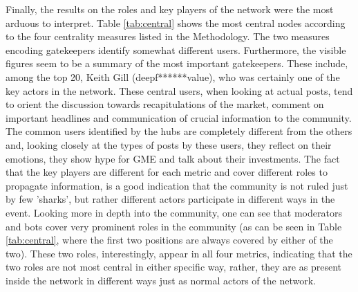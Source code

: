 \documentclass[noacm,sigconf,authorversion]{acmart}
\begin{document}
Finally, the results on the roles and key players of the network were the most arduous to interpret. Table \ref{tab:central} shows the most central nodes according to the four centrality measures listed in the Methodology. The two measures encoding gatekeepers identify somewhat different users. Furthermore, the visible figures seem to be a summary of the most important gatekeepers. These include, among the top 20, Keith Gill (deepf******value), who was certainly one of the key actors in the network. These central users, when looking at actual posts, tend to orient the discussion towards recapitulations of the market, comment on important headlines and communication of crucial information to the community. The common users identified by the hubs are completely different from the others and, looking closely at the types of posts by these users, they reflect on their emotions, they show hype for GME and talk about their investments. The fact that the key players are different for each metric and cover different roles to propagate information, is a good indication that the community is not ruled just by few 'sharks', but rather different actors participate in different ways in the event.
Looking more in depth into the community, one can see that moderators and bots cover very prominent roles in the community (as can be seen in Table \ref{tab:central}, where the first two positions are always covered by either of the two). These two roles, interestingly, appear in all four metrics, indicating that the two roles are not most central in either specific way, rather, they are as present inside the network in different ways just as normal actors of the network. 

\begin{table}
 \begin{center}
\end{center}
 \caption{Table containing top central nodes of the network. Not considering  OPINION\_IS\_UNPOPULAR and AutoModerator which are always the most central (except for Hubs). The first is a moderator while the second is an automatic moderator. When a user is a moderator in the table it is bolded, when it is a bot it is highlighted in italics.}
 \label{tab:central}
\end{table}
\end{document}

